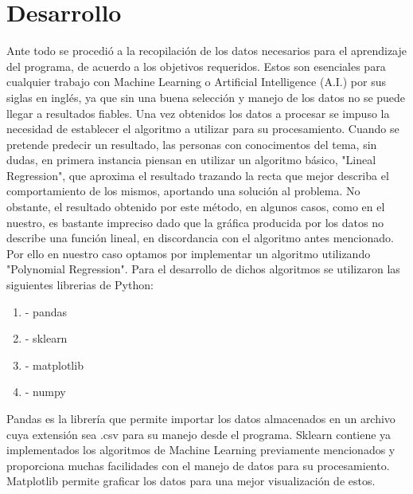 \documentclass[a4paper,12pt]{article}
\begin{document}
\section{Desarrollo}
\cline{-} Ante todo se procedi\'{o} a la recopilaci\'{o}n de los datos necesarios para el aprendizaje del programa, de acuerdo a los objetivos requeridos. Estos son esenciales para cualquier trabajo con Machine Learning o Artificial Intelligence (A.I.) por sus siglas en ingl\'{e}s, ya que sin una buena selecci\'{o}n y manejo de los datos no se puede llegar a resultados fiables.
\cline{-} Una vez obtenidos los datos a procesar se impuso la necesidad de establecer el algoritmo a utilizar para su procesamiento.
\cline{-} Cuando se pretende predecir un resultado, las personas con conocimentos del tema, sin dudas, en primera instancia piensan en utilizar un algoritmo b\'{a}sico, "Lineal Regression", que aproxima el resultado trazando la recta que mejor describa el comportamiento de los mismos, aportando una soluci\'{o}n al problema. No obstante, el resultado obtenido por este m\'{e}todo, en algunos casos, como en el nuestro, es bastante impreciso dado que la gr\'{a}fica producida por los datos no describe una funci\'{o}n lineal, en discordancia con el algoritmo antes mencionado. Por ello en nuestro caso optamos por implementar un algoritmo utilizando "Polynomial Regression".
\cline{-} Para el desarrollo de dichos algoritmos se utilizaron las siguientes librerias de Python:
\begin{enumerate}
\item - pandas
\item - sklearn
\item - matplotlib
\item - numpy
\end{enumerate}
\cline{-} Pandas es la librer\'{i}a que permite importar los datos almacenados en un archivo cuya extensi\'{o}n sea .csv para su manejo desde el programa.
\cline{-} Sklearn contiene ya implementados los algoritmos de Machine Learning previamente mencionados y proporciona muchas facilidades con el manejo de datos para su procesamiento.
\cline{-} Matplotlib permite graficar los datos para una mejor visualizaci\'{o}n de estos.
\end{document}
